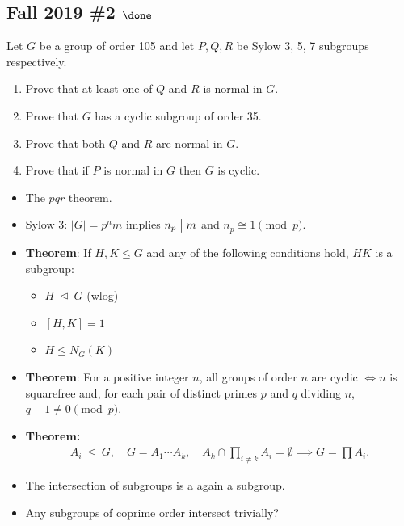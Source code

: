 \hypertarget{fall-2019-2-done}{%
\subsection{\texorpdfstring{Fall 2019 \#2
\(\done\)}{Fall 2019 \#2 \textbackslash done}}\label{fall-2019-2-done}}

Let \(G\) be a group of order 105 and let \(P, Q, R\) be Sylow 3, 5, 7
subgroups respectively.

\begin{enumerate}
\def\labelenumi{\alph{enumi}.}
\item
  Prove that at least one of \(Q\) and \(R\) is normal in \(G\).
\item
  Prove that \(G\) has a cyclic subgroup of order 35.
\item
  Prove that both \(Q\) and \(R\) are normal in \(G\).
\item
  Prove that if \(P\) is normal in \(G\) then \(G\) is cyclic.
\end{enumerate}

\begin{concept}

\envlist

\begin{itemize}
\item
  The \(pqr\) theorem.
\item
  Sylow 3: \({\left\lvert {G} \right\rvert} = p^n m\) implies
  \(n_p \bigm|m\) and \(n_p \cong 1 \pmod p\).
\item
  \textbf{Theorem}: If \(H, K \leq G\) and any of the following
  conditions hold, \(HK\) is a subgroup:

  \begin{itemize}
  \tightlist
  \item
    \(H{~\trianglelefteq~}G\) (wlog)
  \item
    \([H, K] = 1\)
  \item
    \(H \leq N_G(K)\)
  \end{itemize}
\item
  \textbf{Theorem}: For a positive integer \(n\), all groups of order
  \(n\) are cyclic \(\iff n\) is squarefree and, for each pair of
  distinct primes \(p\) and \(q\) dividing \(n\),
  \(q - 1 \neq 0 \pmod p\).
\item
  \textbf{Theorem:}
  \begin{align*}
  A_i{~\trianglelefteq~}G, \quad G = A_1 \cdots A_k,\quad A_k \cap\prod_{i\neq k} A_i = \emptyset \implies G = \prod A_i
  .\end{align*}
\item
  The intersection of subgroups is a again a subgroup.
\item
  Any subgroups of coprime order intersect trivially?
\end{itemize}

\end{concept}

